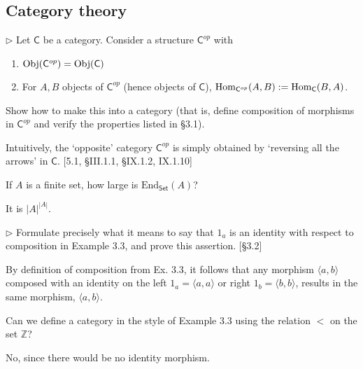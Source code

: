 \subsection{Category theory}


\begin{problem}
  $\rhd$ Let $\mathsf{C}$ be a category. Consider a structure
  $\mathsf{C}^{op}$ with
  \begin{enumerate}
    \item $\mathrm{Obj}(\mathsf{C}^{op}) = \mathrm{Obj}(\mathsf{C})$
    \item For $A, B$ objects of $\mathsf{C}^{op}$ (hence objects of
    $\mathsf{C}$), $\mathrm{Hom}_{\mathsf{C}^{op}}(A, B) := \mathrm{Hom}_{\mathsf{C}}(B, A)$.
  \end{enumerate}
  Show how to make this into a category (that is, define composition of
  morphisms in $\mathsf{C}^{op}$ and verify the properties listed in \S3.1).

  Intuitively, the `opposite' category $\mathsf{C}^{op}$ is simply obtained
  by `reversing all the arrows' in $\mathsf{C}$. [5.1, \S III.1.1, \S IX.1.2,
  IX.1.10]
\end{problem}

\begin{problem}
  If $A$ is a finite set, how large is $\mathrm{End}_{\mathsf{Set}}(A)$?
\end{problem}
\begin{solution}
  It is $|A|^{|A|}$.
\end{solution}

\begin{problem}
  $\rhd$ Formulate precisely what it means to say that $1_a$ is an identity
  with respect to composition in Example 3.3, and prove this assertion.
  [\S3.2]
\end{problem}
\begin{solution}
  By definition of composition from Ex. 3.3, it follows that any morphism
  $\langle a, b \rangle$ composed with an identity on the left
  $1_a = \langle a, a \rangle$ or right $1_b = \langle b, b \rangle$, results
  in the same morphism, $\langle a, b \rangle$.
\end{solution}

\begin{problem}
  Can we define a category in the style of Example 3.3 using the relation
  $<$ on the set $\mathbb{Z}$?
\end{problem}
\begin{solution}
No, since there would be no identity morphism.
\end{solution}

